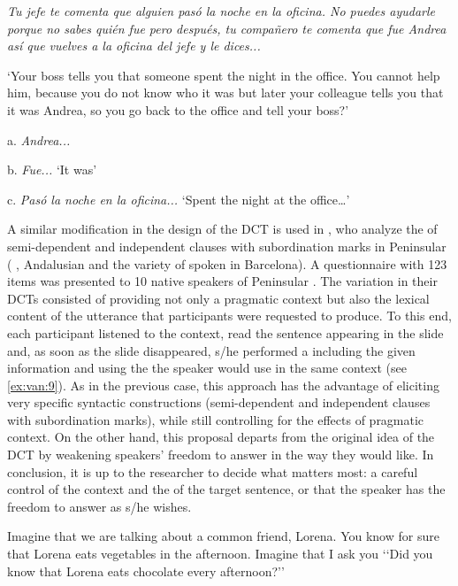 \documentclass[output=paper]{LSP/langsci}
\begin{document}
\ea%
    \label{ex:van:8} 

         \textit{Tu jefe te comenta que alguien pasó la noche en la oficina. No puedes ayudarle porque no sabes quién fue pero después, tu compañero te comenta que fue Andrea así que vuelves a la oficina del jefe y le dices...}

‘Your boss tells you that someone spent the night in the office. You cannot help him, because you do not know who it was but later your colleague tells you that it was Andrea, so you go back to the office and tell your boss?’

a. \textit{Andrea...}

b. \textit{Fue...} ‘It was’

c. \textit{Pasó la noche en la oficina...} ‘Spent the night at the office…’
\z

A similar modification in the design of the DCT is used in \citep{ElviraGarcia2017}, who analyze the  of semi-dependent and independent clauses with subordination marks in Peninsular  ( , Andalusian  and the variety of  spoken in Barcelona). A questionnaire with 123 items was presented to 10 native speakers of Peninsular . The variation in their DCTs consisted of providing not only a pragmatic context but also the lexical content of the utterance that par\-ti\-ci\-pants were requested to produce. To this end, each participant listened to the context, read the sentence appearing in the slide and, as soon as the slide disappeared, s/he performed a  including the given information and using the  the speaker would use in the same context (see \ref{ex:van:9}). As in the previous case, this approach has the advantage of eliciting very specific syntactic constructions (semi-dependent and independent clauses with subordination marks), while still controlling for the effects of pragmatic context. On the other hand, this proposal departs from the original idea of the DCT by weakening speakers’ freedom to answer in the way they would like. In conclusion, it is up to the researcher to decide what matters most: a careful control of the context and the  of the target sentence, or that the speaker has the freedom to answer as s/he wishes. 

\ea%
    \label{ex:van:9} 

         Imagine that we are talking about a common friend, Lorena. You know for sure that Lorena eats vegetables in the afternoon. Imagine that I ask you ‘‘Did you know that Lorena eats chocolate every afternoon?’’ 
\end{document}
